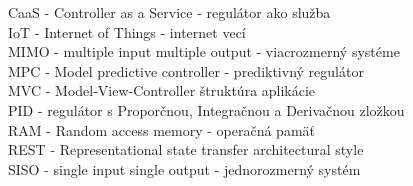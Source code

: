 CaaS - Controller as a Service - regulátor ako služba \\
IoT - Internet of Things - internet vecí \\
MIMO - multiple input multiple output - viacrozmerný systéme \\
MPC - Model predictive controller - prediktivný regulátor \\
MVC - Model-View-Controller štruktúra aplikácie \\
PID - regulátor s Proporčnou, Integračnou a Derivačnou zložkou \\
RAM - Random access memory - operačná pamäť \\
REST - Representational state transfer architectural style \\
SISO - single input single output - jednorozmerný systém
